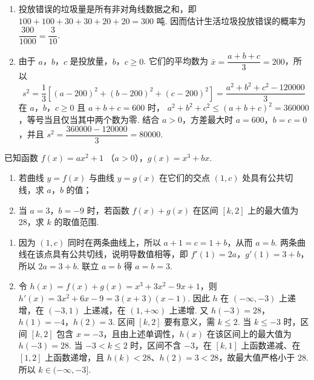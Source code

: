 \begin{problem}
\begin{solution}
\begin{enumerate}
\item 投放错误的垃圾量是所有非对角线数据之和，即
\(100+100+30+30+20+20=300\) 吨. 因而估计生活垃圾投放错误的概率为 \(\dfrac{300}{1000}=\dfrac{3}{10}\).

\item 由于 \(a\)，\(b\)，\(c\) 是投放量，\(b\)，\(c\geqslant0\). 它们的平均数为 \(\bar{x}=\dfrac{a+b+c}{3}=200\)，所以
\[
s^2=\frac{1}{3}\left[(a-200)^2+(b-200)^2+(c-200)^2\right]
=\frac{a^2+b^2+c^2-120000}{3}
\]
在 \(a\)，\(b\)，\(c\geqslant0\) 且 \(a+b+c=600\) 时，
\(a^2+b^2+c^2\leqslant(a+b+c)^2=360000\)，等号当且仅当其中两个数为零. 结合 \(a>0\)，方差最大时 \(a=600\)，\(b=c=0\)，并且
\(s^2=\dfrac{360000-120000}{3}=80000\).
\end{enumerate}
\end{solution}
\end{problem}

\begin{problem}
已知函数 \(f(x) = ax^2 + 1\) （\(a > 0\)），\(g(x) = x^3 + bx\).
\begin{enumerate}
\item 若曲线 \(y = f(x)\) 与曲线 \(y = g(x)\) 在它们的交点 \((1, c)\) 处具有公共切线，求 \(a\)，\(b\) 的值；
\item 当 \(a = 3\)，\(b = -9\) 时，若函数 \(f(x) + g(x)\) 在区间 \([k, 2]\) 上的最大值为 28，求 \(k\) 的取值范围.
\end{enumerate}
\begin{solution}
\begin{enumerate}
\item 因为 \((1,c)\) 同时在两条曲线上，所以 \(a+1=c=1+b\)，从而 \(a=b\). 两条曲线在该点具有公共切线，说明导数值相等，即
\(f'(1)=2a\)，\(g'(1)=3+b\)，所以 \(2a=3+b\). 联立 \(a=b\) 得 \(a=b=3\).

\item 令 \(h(x)=f(x)+g(x)=x^3+3x^2-9x+1\)，则
\(h'(x)=3x^2+6x-9=3(x+3)(x-1)\). 因此 \(h\) 在 \((-\infty,-3)\) 上递增，在 \((-3,1)\) 上递减，在 \((1,+\infty)\) 上递增. 又
\(h(-3)=28\)，\(h(1)=-4\)，\(h(2)=3\).
区间 \([k,2]\) 要有意义，需 \(k\leqslant2\). 当 \(k\leqslant-3\) 时，区间 \([k,2]\) 包含 \(x=-3\)，且由上述单调性，\(h(x)\) 在该区间上的最大值为 \(h(-3)=28\). 当 \(-3<k\leqslant2\) 时，区间不含 \(-3\)，在 \([k,1]\) 上函数递减、在 \([1,2]\) 上函数递增，且 \(h(k)<28\)、\(h(2)=3<28\)，故最大值严格小于 \(28\). 所以 \(k\in(-\infty,-3]\).
\end{enumerate}
\end{solution}
\end{problem}

